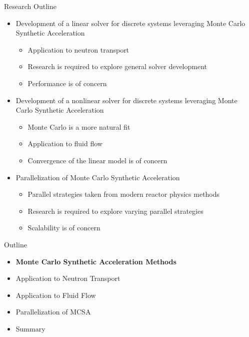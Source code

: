 \documentclass{beamer}
\begin{document}
\begin{frame}{Research Outline}
  \begin{itemize}
  \item Development of a linear solver for discrete systems leveraging
    Monte Carlo Synthetic Acceleration
    \medskip
    \begin{itemize}
    \item Application to neutron transport
    \item Research is required to explore general solver development
    \item Performance is of concern
    \end{itemize}
    \bigskip
  \item Development of a nonlinear solver for discrete systems
    leveraging Monte Carlo Synthetic Acceleration
    \begin{itemize}
    \item Monte Carlo is a more natural fit
    \item Application to fluid flow
    \item Convergence of the linear model is of concern
    \end{itemize}
    \bigskip
  \item Parallelization of Monte Carlo Synthetic Acceleration
    \medskip
    \begin{itemize}
    \item Parallel strategies taken from modern reactor physics
      methods
    \item Research is required to explore varying parallel strategies
    \item Scalability is of concern
    \end{itemize}
  \end{itemize}
\end{frame}

\begin{frame}{Outline}

  \begin{itemize}
  \item \textbf{Monte Carlo Synthetic Acceleration Methods}
    \bigskip
  \item Application to Neutron Transport
    \bigskip
  \item Application to Fluid Flow
    \bigskip
  \item Parallelization of MCSA
    \bigskip
  \item Summary
  \end{itemize}

\end{frame}
\end{document}
